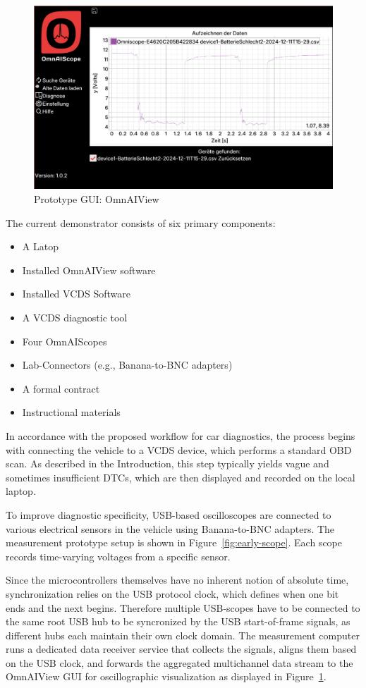 \begin{figure}[ht]
  \centering
  \includegraphics[width=0.9\linewidth]{figures/legacy_gui.png}
  \caption{Prototype GUI: OmnAIView}
  \label{fig:gui}
\end{figure}

The current demonstrator consists of six primary components:
\begin{itemize}
  \item A Latop
  \item Installed OmnAIView software
  \item Installed VCDS Software
  \item A VCDS diagnostic tool
  \item Four OmnAIScopes
  \item Lab-Connectors (e.g., Banana-to-BNC adapters)
  \item A formal contract
  \item Instructional materials
\end{itemize}
In accordance with the proposed workflow for car diagnostics, the process begins with connecting the vehicle to a VCDS device, which performs a standard OBD scan. 
As described in the Introduction, this step typically yields vague and sometimes insufficient DTCs, which are then displayed and recorded on the local laptop.

To improve diagnostic specificity, USB-based oscilloscopes are connected to various electrical sensors in the vehicle using Banana-to-BNC adapters. 
The measurement prototype setup is shown in Figure~\ref{fig:early-scope}.
Each scope records time-varying voltages from a specific sensor. 

Since the microcontrollers themselves have no inherent notion of absolute time, synchronization relies on the USB protocol clock, which defines when one bit ends and the next begins. 
Therefore multiple USB-scopes have to be connected to the same root USB hub to be syncronized by the USB start-of-frame signals, as different hubs each maintain their own clock domain.
The measurement computer runs a dedicated data receiver service that collects the signals, aligns them based on the USB clock, and forwards the aggregated multichannel data stream to the OmnAIView GUI for oscillographic visualization as displayed in Figure~\ref{fig:gui}.

